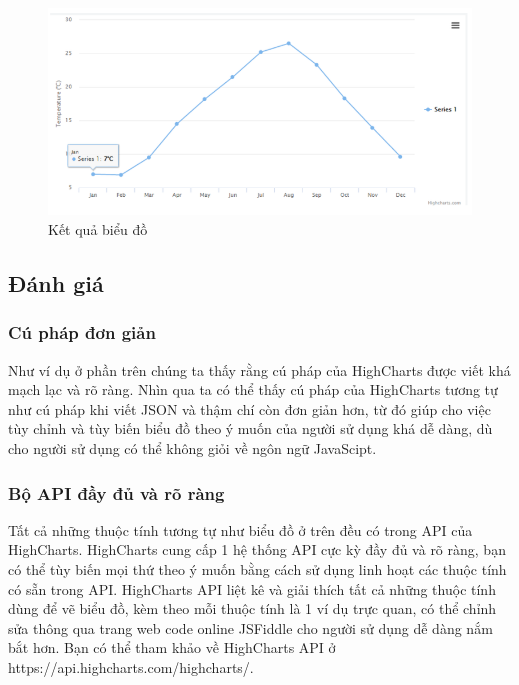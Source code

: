 \begin{center}
	\begin{figure}[htp]
		\begin{center}
			\includegraphics[scale=1]{img/ketquahighcharts}
		\end{center}
		\caption{Kết quả biểu đồ}
		\label{refhinh20}
	\end{figure}
\end{center}

\subsection{Đánh giá}

\subsubsection{Cú pháp đơn giản}
Như ví dụ ở phần trên chúng ta thấy rằng cú pháp của HighCharts được viết khá mạch lạc và rõ ràng. Nhìn qua ta có thể thấy cú pháp của HighCharts tương tự như cú pháp khi viết JSON và thậm chí còn đơn giản hơn, từ đó giúp cho việc tùy chỉnh và tùy biến biểu đồ theo ý muốn của người sử dụng khá dễ dàng, dù cho người sử dụng có thể không giỏi về ngôn ngữ JavaScipt.

\subsubsection{Bộ API đầy đủ và rõ ràng}
Tất cả những thuộc tính tương tự như biểu đồ ở trên đều có trong API của HighCharts. HighCharts cung cấp 1 hệ thống API cực kỳ đầy đủ và rõ ràng, bạn có thể tùy biến mọi thứ theo ý muốn bằng cách sử dụng linh hoạt các thuộc tính có sẵn trong API. HighCharts API liệt kê và giải thích tất cả những thuộc tính dùng để vẽ biểu đồ, kèm theo mỗi thuộc tính là 1 ví dụ trực quan, có thể chỉnh sửa thông qua trang web code online JSFiddle cho người sử dụng dễ dàng nắm bắt hơn. Bạn có thể tham khảo về HighCharts API ở https://api.highcharts.com/highcharts/.

